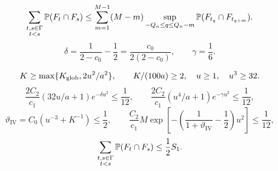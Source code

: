 \begin{equation}\label{eq:pair-count}
 \sum_{\substack{t,s\in\Gamma\\t<s}}\P(F_t\cap F_s)
 \le\sum_{m=1}^{M-1}(M-m)
 \sup_{-Q_n\le q\le Q_n-m}\P(F_{t_q}\cap F_{t_{q+m}}).
\end{equation}
\begin{equation*}
 \delta=\frac1{2-c_0}-\frac12=\frac{c_0}{2(2-c_0)},\qquad
 \gamma=\frac16.
\end{equation*}
\begin{proposition}\label{prop:sum}
\[K\ge\max\{\Kglob,2u^2/a^2\},\qquad K/(100a)\ge2,
 \quad u\ge1,\quad u^3\ge 32.\]
\begin{equation*}
 \frac{2C_2}{c_1}(32u/a+1)e^{-\delta u^2}\le\frac1{12},\qquad
 \frac{2C_2}{c_1}(u^4/a+1)e^{-\gamma u^2}\le\frac1{12},
\end{equation*}
\begin{equation*}
 \vartheta_{\mathrm{IV}}=C_0(u^{-3}+K^{-1})\le\frac12,\qquad
 \frac{C_2}{c_1}M\exp\left[-\left(\frac1{1+\vartheta_{\mathrm{IV}}}-\frac12\right)u^2\right]\le\frac1{12},
\end{equation*}
\[\sum_{\substack{t,s\in\Gamma\\t<s}}\P(F_t\cap F_s)\le\frac12S_1.\]
\end{proposition}
